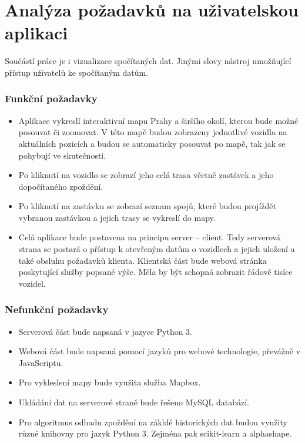 \section{Analýza požadavků na uživatelskou aplikaci}

Součástí práce je i vizualizace spočítaných dat. Jinými slovy nástroj umožňující přístup uživatelů ke spočítaným datům.

\subsubsection{Funkční požadavky}

\begin{itemize}
	\item Aplikace vykreslí interaktivní mapu Prahy a širšího okolí, kterou bude možné posouvat či zoomovat. V této mapě budou zobrazeny jednotlivé vozidla na aktuálních pozicích a budou se automaticky posouvat po mapě, tak jak se pohybují ve skutečnosti.

	\item Po kliknutí na vozidlo se zobrazí jeho celá trasa včetně zastávek a jeho dopočítaného zpoždění.

	\item Po kliknutí na zastávku se zobrazí seznam spojů, které budou projíždět vybranou zastávkou a jejich trasy se vykreslí do mapy.

	\item Celá aplikace bude postavena na principu server -- client. Tedy serverová strana se postará o přístup k otevřeným datům o vozidlech a jejich uložení a také obsluhu požadavků klienta. Klientská část bude webová stránka poskytující služby popsané výše. Měla by být schopná zobrazit řádově tisíce vozidel.
\end{itemize}

\subsubsection{Nefunkční požadavky}

\begin{itemize}
	\item Serverová část bude napsaná v jazyce Python 3.

	\item Webová část bude napsaná pomocí jazyků pro webové technologie, převážně v JavaScriptu.

	\item Pro vykleslení mapy bude využita služba Mapbox.

	\item Ukládání dat na serverové straně bude řešeno MySQL databází.

	\item Pro algoritmus odhadu zpoždění na zákldě historických dat budou využity různé knihovny pro jazyk Python 3. Zejména pak scikit-learn a alphashape.

\end{itemize}

